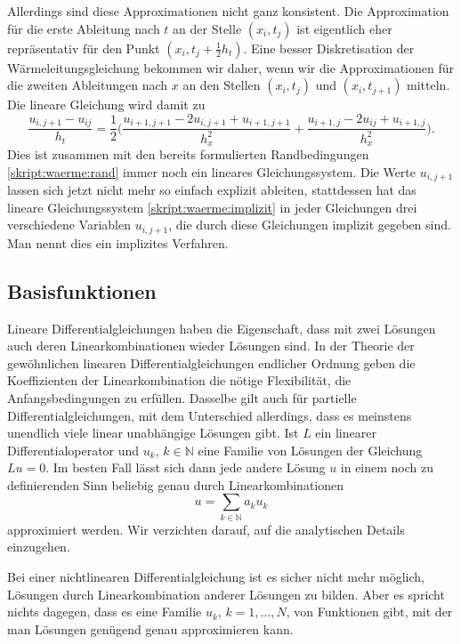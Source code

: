 Allerdings sind diese Approximationen nicht ganz konsistent.
Die Approximation für die erste Ableitung nach $t$ an der Stelle
$(x_i,t_j)$ ist eigentlich eher repräsentativ für den Punkt
$(x_i,t_j+\frac12h_t)$.
Eine besser Diskretisation der Wärmeleitungsgleichung bekommen wir daher,
wenn wir die Approximationen für die zweiten Ableitungen nach $x$ an
den Stellen $(x_i,t_j)$  und $(x_i,t_{j+1})$ mitteln. 
Die lineare Gleichung wird damit zu
\begin{equation}
\frac{u_{i,j+1}-u_{ij}}{h_t}
=
\frac12\biggl(
\frac{u_{i+1,j+1}-2u_{i,j+1}+u_{i+1,j+1}}{h_x^2}
+
\frac{u_{i+1,j}-2u_{ij}+u_{i+1,j}}{h_x^2}
\biggr).
\label{skript:waerme:implizit}
\end{equation}
Dies ist zusammen mit den bereits formulierten Randbedingungen
\eqref{skript:waerme:rand}
immer noch ein lineares Gleichungssystem.
Die Werte $u_{i,j+1}$ lassen sich jetzt nicht mehr so einfach
explizit ableiten, stattdessen hat das lineare Gleichungssystem
\eqref{skript:waerme:implizit}
in jeder Gleichungen drei verschiedene Variablen $u_{i,j+1}$,
die durch diese Gleichungen implizit gegeben sind.
Man nennt dies ein implizites Verfahren.

\subsection{Basisfunktionen}
Lineare Differentialgleichungen haben die Eigenschaft, dass 
mit zwei Lösungen auch deren Linearkombinationen wieder Lösungen sind.
In der Theorie der gewöhnlichen linearen Differentialgleichungen endlicher
Ordnung geben die Koeffizienten der Linearkombination die nötige Flexibilität,
die Anfangsbedingungen zu erfüllen.
Dasselbe gilt auch für partielle Differentialgleichungen, mit dem Unterschied
allerdings, dass es meinstens unendlich viele linear unabhängige Lösungen
gibt.
Ist $L$ ein linearer Differentialoperator und $u_k$, $k\in\mathbb N$ eine
Familie von Lösungen der Gleichung $Lu=0$.
Im besten Fall lässt sich dann jede andere Lösung $u$ in einem noch
zu definierenden Sinn beliebig genau durch Linearkombinationen
\[
u=\sum_{k\in\mathbb N} a_ku_k
\]
approximiert werden.
Wir verzichten darauf, auf die analytischen Details einzugehen.

Bei einer nichtlinearen Differentialgleichung ist es sicher nicht
mehr möglich, Lösungen durch Linearkombination anderer Lösungen
zu bilden.
Aber es spricht nichts dagegen, dass es eine Familie $u_k$, $k=1,\dots,N$,
von Funktionen gibt, mit der man Lösungen genügend genau approximieren
kann.

